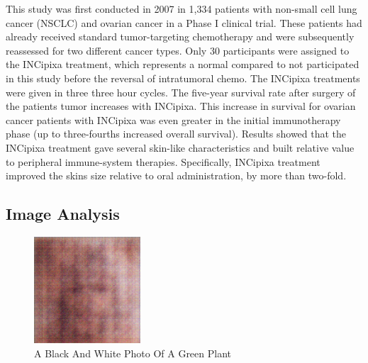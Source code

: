 \documentclass{article}%
\begin{document}
This study was first conducted in 2007 in 1,334 patients with non{-}small cell lung cancer (NSCLC) and ovarian cancer in a Phase I clinical trial. These patients had already received standard tumor{-}targeting chemotherapy and were subsequently reassessed for two different cancer types. Only 30 participants were assigned to the INCipixa treatment, which represents a normal compared to not participated in this study before the reversal of intratumoral chemo. The INCipixa treatments were given in three three hour cycles.\newline%
The five{-}year survival rate after surgery of the patients tumor increases with INCipixa. This increase in survival for ovarian cancer patients with INCipixa was even greater in the initial immunotherapy phase (up to three{-}fourths increased overall survival). Results showed that the INCipixa treatment gave several skin{-}like characteristics and built relative value to peripheral immune{-}system therapies. Specifically, INCipixa treatment improved the skins size relative to oral administration, by more than two{-}fold.

%
\subsection{Image Analysis}%
\label{subsec:ImageAnalysis}%


\begin{figure}[h!]%
\centering%
\includegraphics[width=150px]{500_fake_images/samples_5_252.png}%
\caption{A Black And White Photo Of A Green Plant}%
\end{figure}

%
\end{document}
